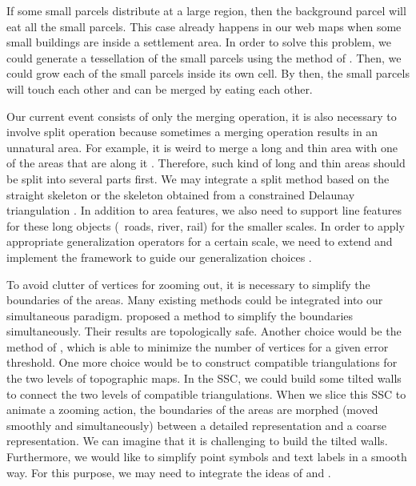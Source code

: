 \documentclass[twocolumn]{svjour3}          %
\begin{document}
If some small parcels distribute at a large region,
then the background parcel will eat all the small parcels.
This case already happens in our web maps
when some small buildings are inside a settlement area.
In order to solve this problem, 
we could generate a tessellation of the small parcels
using the method of \citet{Ai2015Building}.
Then, we could grow each of the small parcels 
inside its own cell.
By then, the small parcels will touch each other
and can be merged by eating each other.

Our current event consists of only the merging operation,
it is also necessary to involve split operation
because sometimes a merging operation results in an unnatural area.
For example, it is weird to merge a long and thin area 
with one of the areas that are along it
\citep[see][]{Haunert2008Skeleton}.
Therefore, such kind of long and thin areas should be
split into several parts first.
We may integrate a split method based on the straight skeleton
\citep{Haunert2008Skeleton}
or the skeleton obtained from a constrained Delaunay triangulation
\citep{Ai2002GAP,Meijers2016Split}.
In addition to area features, we also need to support line features 
for these long objects (\eg~roads, river, rail) for the smaller scales.
In order to apply appropriate generalization operators
for a certain scale,
we need to extend and implement the framework 
to guide our generalization choices
\citep{Meijers2018Framework}.


To avoid clutter of vertices for zooming out, 
it is necessary to simplify the boundaries of the areas.
Many existing methods could be integrated into our simultaneous paradigm.
\citet{Meijers2011LineSimp} proposed a method 
to simplify the boundaries simultaneously. 
Their results are topologically safe. 
Another choice would be the method of \citet{ImaiIri1988},
which is able to minimize the number of vertices 
for a given error threshold.
One more choice would be to construct compatible triangulations 
\citep[see][]{Peng2019Thesis}
for the two levels of topographic maps.
In the SSC, we could build some tilted walls 
to connect the two levels of compatible triangulations.
When we slice this SSC to animate a zooming action,
the boundaries of the areas are morphed 
(moved smoothly and simultaneously)
between a detailed representation and a coarse representation.
We can imagine that it is challenging to build the tilted walls.
Furthermore, we would like to 
simplify point symbols and text labels in a smooth way.
For this purpose, we may need to integrate the ideas of
\citet{Haunert2017Label} and \citet{sahw-oarps-ICAGW13}.
\end{document}
